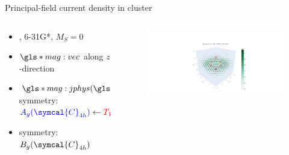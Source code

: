   \begin{frame}{Principal-field current density in  cluster}
    \begin{columns}
      \begin{column}{.40\textwidth}
        \begin{itemize}
          \setlength\itemsep{1.2em}
          \item<1-> , 6-31G*, $M_S = 0$
          \item<1-> $\gls*{mag:vec}$ along $z$-direction
          \item<1-> $\gls*{mag:jphys}(\gls*{bas:spatialcoord})$ symmetry: $\textcolor{blue}{A_g(\symcal{C}_{4h})} \leftarrow \textcolor{red}{T_{1g}(\symcal{O}_{h})}$
          \item<1->  symmetry: $B_g(\symcal{C}_{4h})$
        \end{itemize}
      \end{column}

      \begin{column}{.55\textwidth}
        \begin{figure}
          \centering
          \includegraphics[trim=600 50 500 150, clip, width=\textwidth]{./cursym/data/h6/bz.png}
        \end{figure}
      \end{column}
    \end{columns}
  \end{frame}


